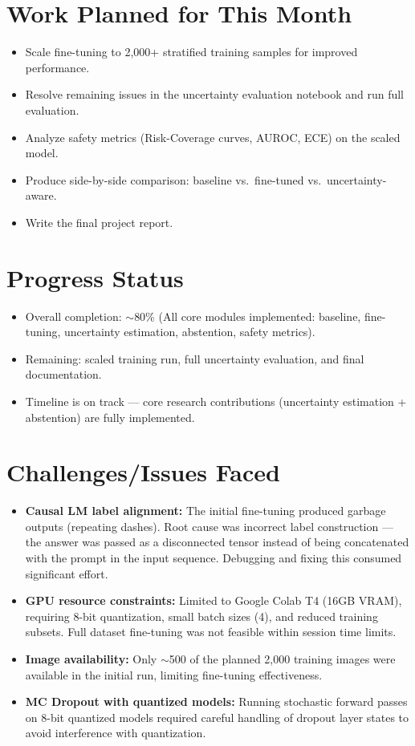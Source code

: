 \documentclass[12pt,a4paper]{article}
\begin{document}
\section{Work Planned for This Month}
\begin{itemize}[leftmargin=*]
    \item Scale fine-tuning to 2,000+ stratified training samples for improved performance.
    \item Resolve remaining issues in the uncertainty evaluation notebook and run full evaluation.
    \item Analyze safety metrics (Risk-Coverage curves, AUROC, ECE) on the scaled model.
    \item Produce side-by-side comparison: baseline vs.\ fine-tuned vs.\ uncertainty-aware.
    \item Write the final project report.
\end{itemize}

\section{Progress Status}
\begin{itemize}[leftmargin=*]
    \item Overall completion: $\sim$80\% (All core modules implemented: baseline, fine-tuning, uncertainty estimation, abstention, safety metrics).
    \item Remaining: scaled training run, full uncertainty evaluation, and final documentation.
    \item Timeline is on track --- core research contributions (uncertainty estimation + abstention) are fully implemented.
\end{itemize}

\section{Challenges/Issues Faced}
\begin{itemize}[leftmargin=*]
    \item \textbf{Causal LM label alignment:} The initial fine-tuning produced garbage outputs (repeating dashes). Root cause was incorrect label construction --- the answer was passed as a disconnected tensor instead of being concatenated with the prompt in the input sequence. Debugging and fixing this consumed significant effort.
    \item \textbf{GPU resource constraints:} Limited to Google Colab T4 (16GB VRAM), requiring 8-bit quantization, small batch sizes (4), and reduced training subsets. Full dataset fine-tuning was not feasible within session time limits.
    \item \textbf{Image availability:} Only $\sim$500 of the planned 2,000 training images were available in the initial run, limiting fine-tuning effectiveness.
    \item \textbf{MC Dropout with quantized models:} Running stochastic forward passes on 8-bit quantized models required careful handling of dropout layer states to avoid interference with quantization.
\end{itemize}
\end{document}
